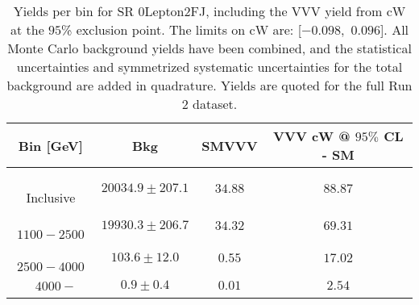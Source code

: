 \begin{table}[!htbp]
    \small
    \center
    \begin{tabular}{c||c|c|c}
    Bin [GeV] & Bkg & SMVVV & \pbox{20cm}{VVV \\ cW @ $95\%$ CL - SM \\ }\\
    \hline
    \pbox{20cm}{ ~ \\Inclusive\\ } & $20034.9 \pm 207.1$ & $34.88$ & $88.87$\\
    \hline
    \pbox{20cm}{ ~ \\$1100-2500$\\ } & $19930.3 \pm 206.7$ & $34.32$ & $69.31$\\
    \hline
    \pbox{20cm}{ ~ \\$2500-4000$\\ } & $103.6 \pm 12.0$ & $0.55$ & $17.02$\\
    \hline
    \pbox{20cm}{ ~ \\$4000-$\\ } & $0.9 \pm 0.4$ & $0.01$ & $2.54$\\
\end{tabular}
    \caption{Yields per bin for SR 0Lepton2FJ, including the VVV yield from cW at the $95$\% exclusion point. The limits on cW are: [$-0.098$,~$0.096$]. All Monte Carlo background yields have been combined, and the statistical uncertainties and symmetrized systematic uncertainties for the total background are added in quadrature. Yields are quoted for the full Run 2 dataset.}
    \label{tab:0Lepton2FJ$binssignal}
\end{table}

